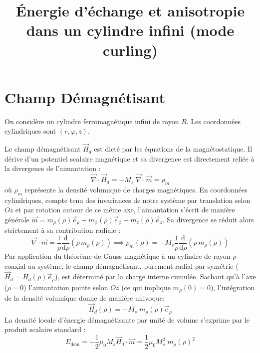 \documentclass[11pt,a4paper]{article}
\title{Énergie d'échange et anisotropie dans un cylindre infini (mode curling)}
\author{}
\date{}
\begin{document}
\maketitle


\section{Champ Démagnétisant}

On considère un cylindre ferromagnétique infini de rayon $R$.
Les coordonnées cylindriques sont $(r,\varphi,z)$.

Le champ démagnétisant $\vec{H}_d$ est dicté par les équations de la magnétostatique. Il dérive d'un potentiel scalaire magnétique et sa divergence est directement reliée à la divergence de l'aimantation :
\begin{equation}
    \vec{\nabla} \cdot \vec{H}_d = -M_s\; \vec{\nabla} \cdot \vec{m} = \rho_m
\end{equation}
où $\rho_m$ représente la densité volumique de charges magnétiques. En coordonnées cylindriques, compte tenu des invariances de notre système par translation selon $Oz$ et par rotation autour de ce même axe, l'aimantation s'écrit de manière générale $\vec{m} = m_\rho(\rho)\vec{e}_\rho + m_\phi(\rho)\vec{e}_\phi + m_z(\rho)\vec{e}_z$. Sa divergence se réduit alors strictement à sa contribution radiale :
\begin{equation}
    \vec{\nabla} \cdot \vec{m} = \frac{1}{\rho} \frac{\text{d}}{\text{d}\rho} \left(\rho \, m_\rho(\rho)\right) \implies \rho_m(\rho) = -M_s\frac{1}{\rho} \frac{\text{d}}{\text{d}\rho} \left(\rho \, m_\rho(\rho)\right)
\end{equation}
Par application du théorème de Gauss magnétique à un cylindre de rayon $\rho$ coaxial au système, le champ démagnétisant, purement radial par symétrie ($\vec{H}_d = H_d(\rho)\vec{e}_\rho$), est déterminé par la charge interne cumulée. Sachant qu'à l'axe ($\rho=0$) l'aimantation pointe selon $Oz$ (ce qui implique $m_\rho(0)=0$), l'intégration de la densité volumique donne de manière univoque:
\begin{equation}
    \vec{H}_d(\rho) = -M_s \; m_\rho(\rho)\vec{e}_\rho
\end{equation}
La densité locale d'énergie démagnétisante par unité de volume s'exprime par le produit scalaire standard :
\begin{equation}
    E_{\text{dém}} = -\frac{1}{2}\mu_0 M_s \vec{H}_d \cdot \vec{m} = \frac{1}{2}\mu_0 M_s^2 \; m_\rho(\rho)^2
\end{equation}
\end{document}

